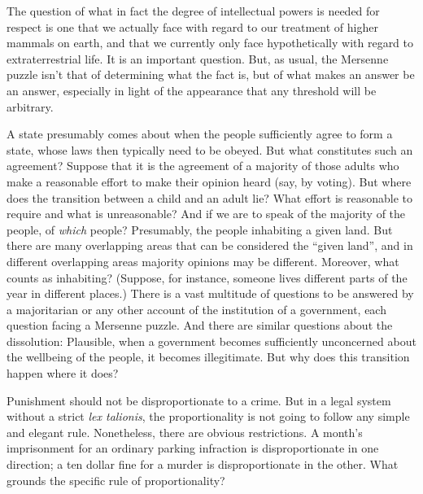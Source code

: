 The question of what in fact the degree of intellectual powers is needed for respect is one that we actually face with regard to our treatment
of higher mammals on earth, and that we currently only face hypothetically with regard to extraterrestrial life. 
It is an important question. But, as usual, the Mersenne puzzle isn't that of determining what the fact is, but of what makes 
an answer be an answer, especially in light of the appearance that any threshold will be arbitrary.

A state presumably comes about when the people sufficiently agree to form a state, whose laws then typically need to be 
obeyed. But what constitutes such an agreement?
Suppose that it is the agreement of a majority of those adults who make a reasonable effort to make their opinion heard
(say, by voting). But where does the transition between a child and an adult lie? What effort is reasonable to require and
what is unreasonable? And if we are to speak of the majority of the people, of \textit{which} people? Presumably, the people
inhabiting a given land. But there are many overlapping areas that can be considered the ``given land'', and in different 
overlapping areas  majority opinions may be different. Moreover, what counts as inhabiting? (Suppose, for instance, someone 
lives different parts of the year in different places.) There is a vast multitude of questions to be answered by a
majoritarian or any other account of the institution of a government, each question facing a Mersenne puzzle. And
there are similar questions about the dissolution: Plausible, when a government becomes sufficiently unconcerned
about the wellbeing of the people, it becomes illegitimate. But why does this transition happen where it does? 

Punishment should not be disproportionate to a crime. But in a legal system without a strict \textit{lex talionis}, the
proportionality is not going to follow any simple and elegant rule. Nonetheless, there are obvious restrictions. 
A month's imprisonment for an ordinary parking infraction is disproportionate in one direction; a ten dollar fine
for a murder is disproportionate in the other. What grounds the specific rule of proportionality?

